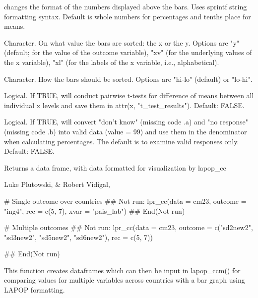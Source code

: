 \documentclass[a4paper]{book}
\begin{document}
\begin{Arguments}
\begin{ldescription}
\item[\code{cfmt}] changes the format of the numbers displayed above the bars.
Uses sprintf string formatting syntax. Default is whole numbers for percentages
and tenths place for means.

\item[\code{sort}] Character. On what value the bars are sorted: the x or the y.
Options are "y" (default; for the value of the outcome variable), "xv" (for
the underlying values of the x variable), "xl" (for the labels of the x variable,
i.e., alphabetical).

\item[\code{order}] Character.  How the bars should be sorted.  Options are "hi-lo"
(default) or "lo-hi".

\item[\code{ttest}] Logical.  If TRUE, will conduct pairwise t-tests for difference
of means between all individual x levels and save them in attr(x,
"t\_test\_results"). Default: FALSE.

\item[\code{keep\_nr}] Logical.  If TRUE, will convert "don't know" (missing code .a)
and "no response" (missing code .b) into valid data (value = 99) and use them
in the denominator when calculating percentages.  The default is to examine
valid responses only.  Default: FALSE.
\end{ldescription}
\end{Arguments}
%
\begin{Value}
Returns a data frame, with data formatted for visualization by lapop\_cc
\end{Value}
%
\begin{Author}
Luke Plutowski,  \& Robert Vidigal, 
\end{Author}
%
\begin{Examples}
\begin{ExampleCode}
# Single outcome over countries
## Not run: lpr_cc(data = cm23,
outcome = "ing4",
rec = c(5, 7),
xvar = "pais_lab")
## End(Not run)

# Multiple outcomes
## Not run: lpr_cc(data = cm23,
outcome = c("sd2new2", "sd3new2", "sd5new2", "sd6new2"),
rec = c(5, 7))

## End(Not run)
\end{ExampleCode}
\end{Examples}
%
\begin{Description}
This function creates dataframes which can then be input in lapop\_ccm() for
comparing values for multiple variables across countries with a bar graph
using LAPOP formatting.
\end{Description}
\end{document}

